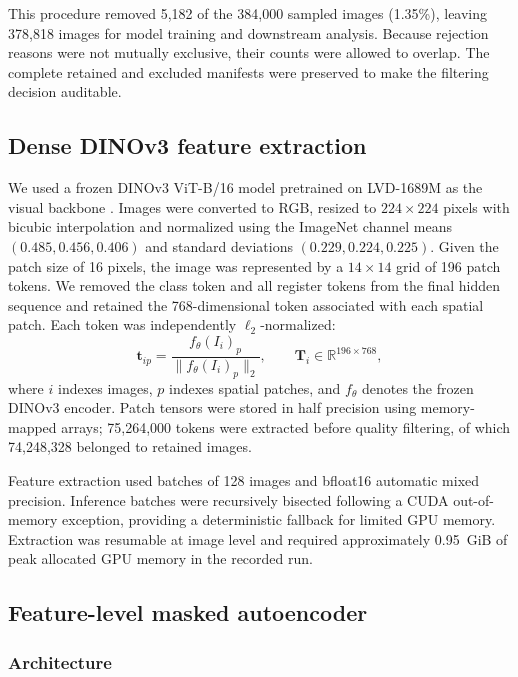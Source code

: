 This procedure removed 5,182 of the 384,000 sampled images (1.35\%), leaving
378,818 images for model training and downstream analysis. Because rejection
reasons were not mutually exclusive, their counts were allowed to overlap. The
complete retained and excluded manifests were preserved to make the filtering
decision auditable.

\subsection{Dense DINOv3 feature extraction}
\label{sec:dinov3_features}

We used a frozen DINOv3 ViT-B/16 model pretrained on LVD-1689M as the visual
backbone \cite{simeoni2025dinov3}. Images were converted to RGB, resized to
$224\times224$ pixels with bicubic interpolation and normalized using the
ImageNet channel means $(0.485,0.456,0.406)$ and standard deviations
$(0.229,0.224,0.225)$. Given the patch size of 16 pixels, the image was
represented by a $14\times14$ grid of 196 patch tokens. We removed the class
token and all register tokens from the final hidden sequence and retained the
768-dimensional token associated with each spatial patch. Each token was
independently $\ell_2$-normalized:
\begin{equation}
  \mathbf{t}_{ip}
  = \frac{f_{\theta}(I_i)_p}
  {\lVert f_{\theta}(I_i)_p\rVert_2},
  \qquad
  \mathbf{T}_i\in\mathbb{R}^{196\times768},
  \label{eq:dino_tokens}
\end{equation}
where $i$ indexes images, $p$ indexes spatial patches, and $f_{\theta}$ denotes
the frozen DINOv3 encoder. Patch tensors were stored in half precision using
memory-mapped arrays; 75,264,000 tokens were extracted before quality filtering,
of which 74,248,328 belonged to retained images.

Feature extraction used batches of 128 images and bfloat16 automatic mixed
precision. Inference batches were recursively bisected following a CUDA
out-of-memory exception, providing a deterministic fallback for limited GPU
memory. Extraction was resumable at image level and required approximately
0.95~GiB of peak allocated GPU memory in the recorded run.

\subsection{Feature-level masked autoencoder}
\label{sec:feature_mae}

\subsubsection{Architecture}

